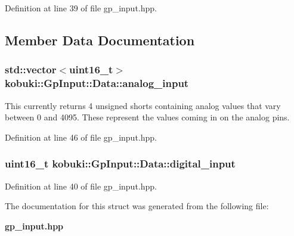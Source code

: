 \-Definition at line 39 of file gp\-\_\-input.\-hpp.



\subsection{\-Member \-Data \-Documentation}
\subsubsection[{analog\-\_\-input}]{\setlength{\rightskip}{0pt plus 5cm}std\-::vector$<$uint16\-\_\-t$>$ {\bf kobuki\-::\-Gp\-Input\-::\-Data\-::analog\-\_\-input}}\label{structkobuki_1_1GpInput_1_1Data_a5a77ebbf4e04790e65f1bfb9a935db70}
\-This currently returns 4 unsigned shorts containing analog values that vary between 0 and 4095. \-These represent the values coming in on the analog pins. 

\-Definition at line 46 of file gp\-\_\-input.\-hpp.

\subsubsection[{digital\-\_\-input}]{\setlength{\rightskip}{0pt plus 5cm}uint16\-\_\-t {\bf kobuki\-::\-Gp\-Input\-::\-Data\-::digital\-\_\-input}}\label{structkobuki_1_1GpInput_1_1Data_a4d91ec153b1310b7ef99af7f61850906}


\-Definition at line 40 of file gp\-\_\-input.\-hpp.



\-The documentation for this struct was generated from the following file\-:\begin{DoxyCompactItemize}
\item 
{\bf gp\-\_\-input.\-hpp}\end{DoxyCompactItemize}
